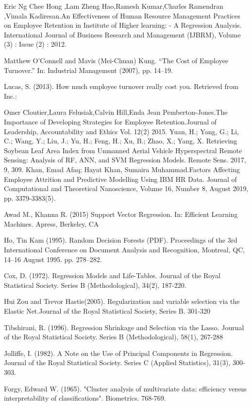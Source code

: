 \documentclass[a4paper, 14 pt, conference]{ieeeconf}
\begin{document}
\begin{thebibliography}{99}

  Eric Ng Chee Hong ,Lam Zheng Hao,Ramesh Kumar,Charles Ramendran ,Vimala Kadiresan.An Effectiveness of Human Resource Management Practices on Employee Retention in Institute of Higher learning: - A Regression Analysis. International Journal of Business Research and Management (IJBRM), Volume (3) : Issue (2) : 2012.

Matthew O’Connell and Mavis (Mei-Chuan) Kung. “The Cost of Employee Turnover.” In: Industrial Management (2007), pp. 14–19.

Lucas, S. (2013). How much employee turnover really cost you. Retrieved from Inc.:

Omer Cloutier,Laura Felusiak,Calvin Hill,Enda Jean Pemberton-Jones.The Importance of Developing Strategies for Employee Retention.Journal of Leadership, Accountability and Ethics Vol. 12(2) 2015.
Yuan, H.; Yang, G.; Li, C.; Wang, Y.; Liu, J.; Yu, H.; Feng, H.; Xu, B.; Zhao, X.; Yang, X. Retrieving Soybean Leaf Area Index from Unmanned Aerial Vehicle Hyperspectral Remote Sensing: Analysis of RF, ANN, and SVM Regression Models. Remote Sens. 2017, 9, 309. 
 Khan, Emad Afaq; Hayat Khan, Sumaira Muhammad.Factors Affecting Employee Attrition and Predictive Modelling Using IBM HR Data. Journal of Computational and Theoretical Nanoscience, Volume 16, Number 8, August 2019, pp. 3379-3383(5).
 
Awad M., Khanna R. (2015) Support Vector Regression. In: Efficient Learning Machines. Apress, Berkeley, CA

Ho, Tin Kam (1995). Random Decision Forests (PDF). Proceedings of the 3rd International Conference on Document Analysis and Recognition, Montreal, QC, 14–16 August 1995. pp. 278–282.

Cox, D. (1972). Regression Models and Life-Tables. Journal of the Royal Statistical Society. Series B (Methodological), 34(2), 187-220. 

Hui Zou and Trevor Hastie(2005). Regularization and variable selection via the Elastic Net.Journal of the Royal Statistical Society, Series B. 301-320

Tibshirani, R. (1996). Regression Shrinkage and Selection via the Lasso. Journal of the Royal Statistical Society. Series B (Methodological), 58(1), 267-288

Jolliffe, I. (1982). A Note on the Use of Principal Components in Regression. Journal of the Royal Statistical Society. Series C (Applied Statistics), 31(3), 300-303.

 Forgy, Edward W. (1965). "Cluster analysis of multivariate data: efficiency versus interpretability of classifications". Biometrics. 768-769.
\end{thebibliography}
\end{document}
